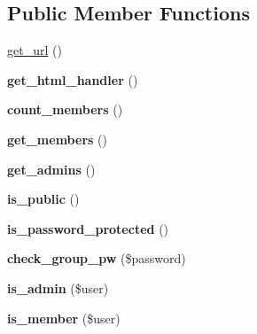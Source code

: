 \subsection*{Public Member Functions}
\begin{DoxyCompactItemize}
\item 
\hyperlink{classkoala__group__default_a1f07db64ef2791aa18ceb6d0f87e1c14}{get\_\-url} ()
\item 
\hypertarget{classkoala__group__default_a4aa10fa8593c442469dd0a30e14c1359}{
{\bfseries get\_\-html\_\-handler} ()}
\label{classkoala__group__default_a4aa10fa8593c442469dd0a30e14c1359}

\item 
\hypertarget{classkoala__group__default_a1328fd42928e48da1a3a70b17e8ed593}{
{\bfseries count\_\-members} ()}
\label{classkoala__group__default_a1328fd42928e48da1a3a70b17e8ed593}

\item 
\hypertarget{classkoala__group__default_a973c60b07930ced992a1e2e7a4a5ff30}{
{\bfseries get\_\-members} ()}
\label{classkoala__group__default_a973c60b07930ced992a1e2e7a4a5ff30}

\item 
\hypertarget{classkoala__group__default_a0af43e76a25f533525c9a9a512eef7f2}{
{\bfseries get\_\-admins} ()}
\label{classkoala__group__default_a0af43e76a25f533525c9a9a512eef7f2}

\item 
\hypertarget{classkoala__group__default_a303bf2ef2be8c6349d0e7bb6fd263694}{
{\bfseries is\_\-public} ()}
\label{classkoala__group__default_a303bf2ef2be8c6349d0e7bb6fd263694}

\item 
\hypertarget{classkoala__group__default_a5fb53b781e6eb9038fc2b745ad659e39}{
{\bfseries is\_\-password\_\-protected} ()}
\label{classkoala__group__default_a5fb53b781e6eb9038fc2b745ad659e39}

\item 
\hypertarget{classkoala__group__default_a8e8969ae9069e75c7e566e17b91ffe23}{
{\bfseries check\_\-group\_\-pw} (\$password)}
\label{classkoala__group__default_a8e8969ae9069e75c7e566e17b91ffe23}

\item 
\hypertarget{classkoala__group__default_a53a928b8ee35fd9183189e87924bcf10}{
{\bfseries is\_\-admin} (\$user)}
\label{classkoala__group__default_a53a928b8ee35fd9183189e87924bcf10}

\item 
\hypertarget{classkoala__group__default_a01362d01c194054d7faace5c1ac02d72}{
{\bfseries is\_\-member} (\$user)}
\label{classkoala__group__default_a01362d01c194054d7faace5c1ac02d72}


\end{DoxyCompactItemize}
